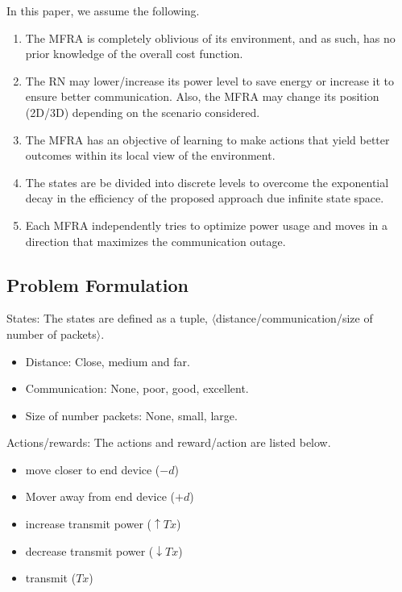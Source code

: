 \documentclass[journal]{IEEEtran}
\begin{document}
In this paper, we assume the following.
\begin{enumerate}
  \item The MFRA is completely oblivious of its environment, and as such, has no prior knowledge of the overall cost function.
  \item The RN may lower/increase its power level to save energy or increase it to ensure better communication. Also, the MFRA may change its position (2D/3D) depending on the scenario considered.
  \item The MFRA has an objective of learning to make actions that yield better outcomes within its local view of the environment.
  \item The states are be divided into discrete levels to overcome the exponential decay in the efficiency of the proposed approach due infinite state space.
  \item Each MFRA independently tries to optimize power usage and moves in a direction that maximizes the communication outage.
\end{enumerate}





\subsection{Problem Formulation}
States: The states are defined as a tuple, $\langle$distance/communication/size of number of packets$\rangle$.
\begin{itemize}
  \item Distance: Close, medium and far.
  \item Communication: None, poor, good, excellent.
  \item Size of number packets: None, small, large.
\end{itemize}


 Actions/rewards: The actions and reward/action are listed below.

 \begin{itemize}
  \item move closer to end device ($-d$)
  \item Mover away from end device ($+d$)
  \item increase transmit power ($\uparrow Tx$)
  \item decrease transmit power ($\downarrow Tx$)
  \item transmit ($Tx$)
\end{itemize}
\end{document}
